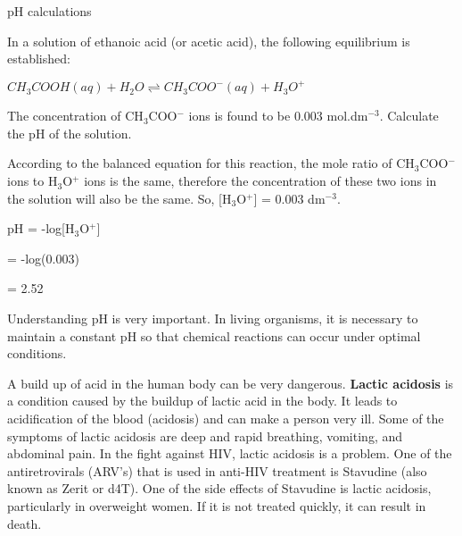\begin{wex}{pH calculations}{In a solution of ethanoic acid (or acetic acid), the following equilibrium is established:

\begin{center}
\rm${CH_{3}COOH(aq) + H_{2}O \rightleftharpoons CH_{3}COO^{-}(aq) + H_{3}O^{+}}$
\end{center}

The concentration of CH$_{3}$COO$^{-}$ ions is found to be 0.003 mol.dm$^{-3}$. Calculate the pH of the solution.\\
}

{

According to the balanced equation for this reaction, the mole ratio of CH$_{3}$COO$^{-}$ ions to H$_{3}$O$^{+}$ ions is the same, therefore the concentration of these two ions in the solution will also be the same. So, [H$_{3}$O$^{+}$] = 0.003 dm$^{-3}$.\\
}

{

pH = -log[H$_{3}$O$^{+}$]

= -log(0.003)

= 2.52
}
\end{wex}

 
Understanding pH is very important. In living organisms, it is necessary to maintain a constant pH so that chemical reactions can occur under optimal conditions. 


\begin{IFact}{A build up of acid in the human body can be very dangerous. \textbf{Lactic acidosis} is a condition caused by the buildup of lactic acid in the body. It leads to acidification of the blood (acidosis) and can make a person very ill. Some of the symptoms of lactic acidosis are deep and rapid breathing, vomiting, and abdominal pain. In the fight against HIV, lactic acidosis is a problem. One of the antiretrovirals (ARV's) that is used in anti-HIV treatment is Stavudine (also known as Zerit or d4T). One of the side effects of Stavudine is lactic acidosis, particularly in overweight women. If it is not treated quickly, it can result in death.
}
\end{IFact}

